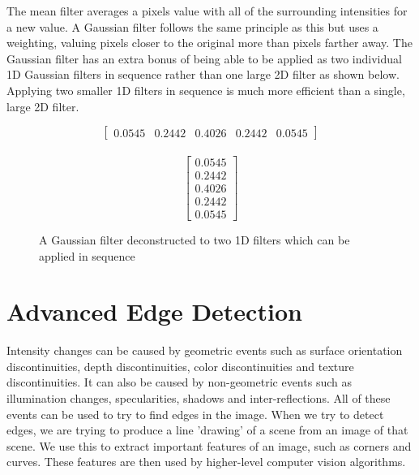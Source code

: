\documentclass{article}
\begin{document}
	The mean filter averages a pixels value with all of the surrounding intensities for a new value. A Gaussian filter follows the same principle as this but uses a weighting, valuing pixels closer to the original more than pixels farther away.	The Gaussian filter has an extra bonus of being able to be applied as two individual 1D Gaussian filters in sequence rather than one large 2D filter as shown below. Applying two smaller 1D filters in sequence is much more efficient than a single, large 2D filter.
	\begin{figure}[ht]
	\begin{multicols}{2}
		\[\begin{bmatrix} 0.0545 & 0.2442 & 0.4026 & 0.2442 & 0.0545 \end{bmatrix} \] \\
		\[\begin{bmatrix} 0.0545 \\ 0.2442 \\ 0.4026 \\ 0.2442 \\ 0.0545 \end{bmatrix} \]
	\end{multicols}
	\caption{A Gaussian filter deconstructed to two 1D filters which can be applied in sequence}
	\label{fig:1d gaussian filter}
	\end{figure}
	
	\section{Advanced Edge Detection}
	Intensity changes can be caused by geometric events such as surface orientation discontinuities, depth discontinuities, color discontinuities and texture discontinuities. It can also be caused by non-geometric events such as illumination changes, specularities, shadows and inter-reflections. All of these events can be used to try to find edges in the image. When we try to detect edges, we are trying to produce a line 'drawing' of a scene from an image of that scene. We use this to extract important features of an image, such as corners and curves. These features are then used by higher-level computer vision algorithms.
	
\end{document}
